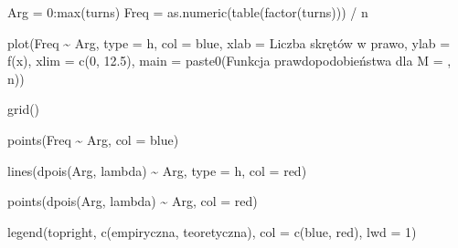 \documentclass[
]{article}
\newenvironment{Shaded}{\begin{snugshade}}{\end{snugshade}}
\newcommand{\AttributeTok}[1]{\textcolor[rgb]{0.77,0.63,0.00}{#1}}
\newcommand{\DecValTok}[1]{\textcolor[rgb]{0.00,0.00,0.81}{#1}}
\newcommand{\FloatTok}[1]{\textcolor[rgb]{0.00,0.00,0.81}{#1}}
\newcommand{\FunctionTok}[1]{\textcolor[rgb]{0.00,0.00,0.00}{#1}}
\newcommand{\NormalTok}[1]{#1}
\newcommand{\OtherTok}[1]{\textcolor[rgb]{0.56,0.35,0.01}{#1}}
\newcommand{\SpecialCharTok}[1]{\textcolor[rgb]{0.00,0.00,0.00}{#1}}
\newcommand{\StringTok}[1]{\textcolor[rgb]{0.31,0.60,0.02}{#1}}
\begin{document}
\begin{Shaded}
\begin{Highlighting}[]
\NormalTok{Arg }\OtherTok{=} \DecValTok{0}\SpecialCharTok{:}\FunctionTok{max}\NormalTok{(turns)}
\NormalTok{Freq }\OtherTok{=} \FunctionTok{as.numeric}\NormalTok{(}\FunctionTok{table}\NormalTok{(}\FunctionTok{factor}\NormalTok{(turns))) }\SpecialCharTok{/}\NormalTok{ n}

\FunctionTok{plot}\NormalTok{(Freq }\SpecialCharTok{\textasciitilde{}}\NormalTok{ Arg, }\AttributeTok{type =} \StringTok{\textquotesingle{}h\textquotesingle{}}\NormalTok{, }\AttributeTok{col =} \StringTok{\textquotesingle{}blue\textquotesingle{}}\NormalTok{, }
     \AttributeTok{xlab =} \StringTok{\textquotesingle{}Liczba skrętów w prawo\textquotesingle{}}\NormalTok{, }\AttributeTok{ylab =} \StringTok{\textquotesingle{}f(x)\textquotesingle{}}\NormalTok{, }
     \AttributeTok{xlim =} \FunctionTok{c}\NormalTok{(}\DecValTok{0}\NormalTok{, }\FloatTok{12.5}\NormalTok{), }\AttributeTok{main =} \FunctionTok{paste0}\NormalTok{(}\StringTok{\textquotesingle{}Funkcja prawdopodobieństwa dla M = \textquotesingle{}}\NormalTok{, n))}

\FunctionTok{grid}\NormalTok{()}

\FunctionTok{points}\NormalTok{(Freq }\SpecialCharTok{\textasciitilde{}}\NormalTok{ Arg, }\AttributeTok{col =} \StringTok{\textquotesingle{}blue\textquotesingle{}}\NormalTok{)}

\FunctionTok{lines}\NormalTok{(}\FunctionTok{dpois}\NormalTok{(Arg, lambda) }\SpecialCharTok{\textasciitilde{}}\NormalTok{ Arg, }\AttributeTok{type =} \StringTok{\textquotesingle{}h\textquotesingle{}}\NormalTok{, }\AttributeTok{col =} \StringTok{\textquotesingle{}red\textquotesingle{}}\NormalTok{)}

\FunctionTok{points}\NormalTok{(}\FunctionTok{dpois}\NormalTok{(Arg, lambda) }\SpecialCharTok{\textasciitilde{}}\NormalTok{ Arg, }\AttributeTok{col =} \StringTok{\textquotesingle{}red\textquotesingle{}}\NormalTok{)}

\FunctionTok{legend}\NormalTok{(}\StringTok{\textquotesingle{}topright\textquotesingle{}}\NormalTok{, }\FunctionTok{c}\NormalTok{(}\StringTok{\textquotesingle{}empiryczna\textquotesingle{}}\NormalTok{, }\StringTok{\textquotesingle{}teoretyczna\textquotesingle{}}\NormalTok{),}
    \AttributeTok{col =} \FunctionTok{c}\NormalTok{(}\StringTok{\textquotesingle{}blue\textquotesingle{}}\NormalTok{, }\StringTok{\textquotesingle{}red\textquotesingle{}}\NormalTok{), }\AttributeTok{lwd =} \DecValTok{1}\NormalTok{)}
\end{Highlighting}
\end{Shaded}
\end{document}
